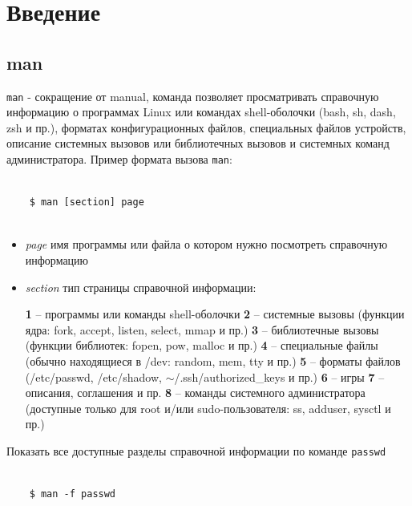 \chapter{Введение}

\section{man}

\texttt{man} - сокращение от manual, команда позволяет просматривать справочную информацию о программах Linux или командах shell-оболочки (bash, sh, dash, zsh и пр.), форматах конфигурационных файлов, специальных файлов устройств, описание системных вызовов или библиотечных вызовов и системных команд администратора. Пример формата вызова \texttt{man}:


\begin{lstlisting}
	
	$ man [section] page
	
\end{lstlisting}	

\begin{itemize}
	
	\item \textit{page} имя программы или файла о котором нужно посмотреть справочную информацию
	\item \textit{section} тип страницы справочной информации:
	
	\subitem \textbf{1} -- программы или команды shell-оболочки
	\subitem \textbf{2} -- системные вызовы (функции ядра: fork, accept, listen, select, mmap и пр.)
	\subitem \textbf{3} -- библиотечные вызовы (функции библиотек: fopen, pow, malloc и пр.)
	\subitem \textbf{4} -- специальные файлы (обычно находящиеся в /dev: random, mem, tty и пр.)
	\subitem \textbf{5} -- форматы файлов (/etc/passwd, /etc/shadow,  $\sim$/.ssh/authorized\_keys и пр.)
	\subitem \textbf{6} -- игры
	\subitem \textbf{7} -- описания, соглашения и пр.
	\subitem \textbf{8} --  команды системного администратора (доступные только для root и/или sudo-пользователя: ss, adduser, sysctl и пр.)
\end{itemize}

Показать все доступные разделы справочной информации по команде \texttt{passwd}
\begin{lstlisting}
	
	$ man -f passwd
	
\end{lstlisting}	



